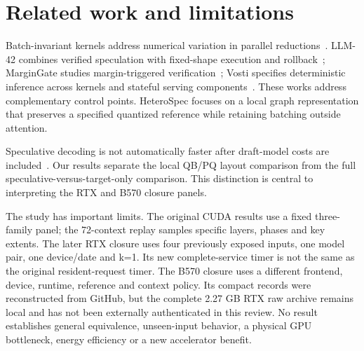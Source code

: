 \section{Related work and limitations}
\label{sec:related}
Batch-invariant kernels address numerical variation in parallel reductions~\cite{thinkingmachines,layercast}. LLM-42 combines verified speculation with fixed-shape execution and rollback~\cite{llm42}; MarginGate studies margin-triggered verification~\cite{margingate}; Vosti specifies deterministic inference across kernels and stateful serving components~\cite{vosti}. These works address complementary control points. HeteroSpec focuses on a local graph representation that preserves a specified quantized reference while retaining batching outside attention.

Speculative decoding is not automatically faster after draft-model costs are included~\cite{illusion,lossless}. Our results separate the local QB/PQ layout comparison from the full speculative-versus-target-only comparison. This distinction is central to interpreting the RTX and B570 closure panels.

The study has important limits. The original CUDA results use a fixed three-family panel; the 72-context replay samples specific layers, phases and key extents. The later RTX closure uses four previously exposed inputs, one model pair, one device/date and k=1. Its new complete-service timer is not the same as the original resident-request timer. The B570 closure uses a different frontend, device, runtime, reference and context policy. Its compact records were reconstructed from GitHub, but the complete 2.27 GB RTX raw archive remains local and has not been externally authenticated in this review. No result establishes general equivalence, unseen-input behavior, a physical GPU bottleneck, energy efficiency or a new accelerator benefit.

